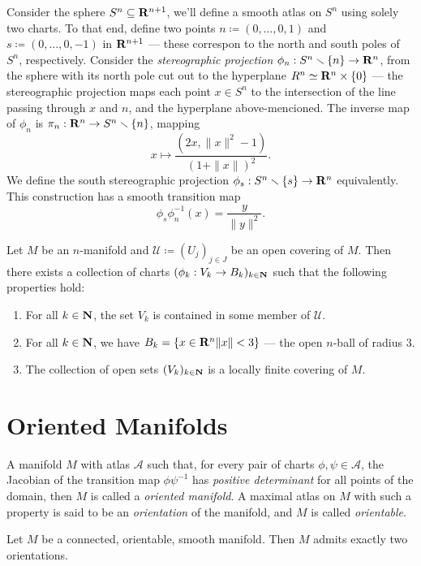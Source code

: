 \begin{example}[Sphere]
\label{exp:sphere-smooth-manifold}
Consider the sphere \(S^n \subseteq \mathbf{R}^{n+1}\), we'll define a smooth atlas on
\(S^n\) using solely two charts. To that end, define two points
\(n \coloneq (0, \dots, 0, 1)\) and \(s \coloneq (0, \dots, 0, -1)\) in
\(\mathbf{R}^{n+1}\) --- these correspon to the north and south poles of \(S^n\),
respectively. Consider the \emph{stereographic projection}
\(\phi_n: S^n \smallsetminus \{n\} \to \mathbf{R}^n\), from the sphere with its north pole
cut out to the hyperplane \(R^n \simeq \mathbf{R}^n \times \{0\}\) --- the stereographic
projection maps each point \(x \in S^n\) to the intersection of the line passing
through \(x\) and \(n\), and the hyperplane above-mencioned. The inverse map of
\(\phi_n\) is \(\pi_n: \mathbf{R}^n \to S^n \smallsetminus \{n\}\), mapping
\[
x \longmapsto \frac{(2 x, \| x \|^2 - 1)}{(1 + \| x \|)^2}.
\]
We define the south stereographic projection \(\phi_s: S^n \smallsetminus \{s\} \to
\mathbf{R}^n\) equivalently. This construction has a smooth transition map
\[
\phi_s \phi_n^{-1}(x) = \frac{y}{\| y \|^2}.
\]
\end{example}

\begin{proposition}
Let \(M\) be an \(n\)-manifold and \(\mathcal{U} \coloneq (U_j)_{j \in J}\) be
an open covering of \(M\). Then there exists a collection of charts \((\phi_k:
V_k \to B_k)_{k \in \mathbf{N}}\) such that the following properties hold:
\begin{enumerate}\setlength\itemsep{0em}
\item For all \(k \in \mathbf{N}\), the set \(V_k\) is contained in some member of
  \(\mathcal{U}\).
\item For all \(k \in \mathbf{N}\), we have \(B_k = \{x \in \mathbf{R}^n \relax \| x \| < 3\}\)
  --- the open \(n\)-ball of radius \(3\).
\item The collection of open sets \((V_k)_{k \in \mathbf{N}}\) is a locally finite
  covering of \(M\).
\end{enumerate}
\end{proposition}


\section{Oriented Manifolds}

\begin{definition}
\label{def:oriented-manifolds}
A manifold \(M\) with atlas \(\mathcal{A}\) such that, for every pair of charts
\(\phi, \psi \in \mathcal{A}\), the Jacobian of the transition map
\(\phi \psi^{-1}\) has \emph{positive determinant} for all points of the domain,
then \(M\) is called a \emph{oriented manifold}. A maximal atlas on \(M\) with
such a property is said to be an \emph{orientation} of the manifold, and \(M\)
is called \emph{orientable}.
\end{definition}

\begin{proposition}
\label{prop:two-orientations-man}
Let \(M\) be a connected, orientable, smooth manifold. Then \(M\) admits exactly
two orientations.
\end{proposition}


